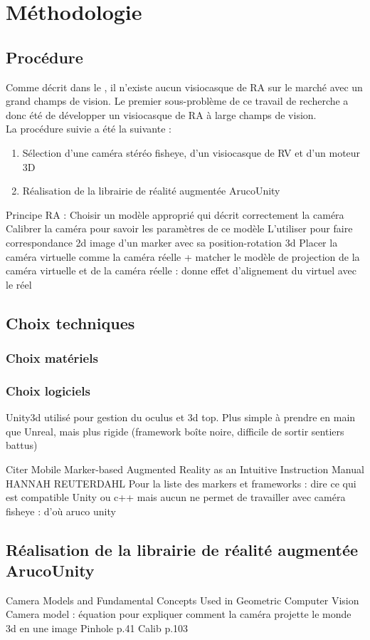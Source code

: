 \chapter{Méthodologie}
\label{ch:methodology}

\section{Procédure}
Comme décrit dans le , il n'existe aucun visiocasque de RA sur le marché avec un grand champs de vision. Le premier sous-problème de ce travail de recherche a donc été de développer un visiocasque de RA à large champs de vision.\\
La procédure suivie a été la suivante :
\begin{enumerate}
  \item Sélection d'une caméra stéréo fisheye, d'un visiocasque de RV et d'un moteur 3D
  \item Réalisation de la librairie de réalité augmentée ArucoUnity
\end{enumerate}
Principe RA :
Choisir un modèle approprié qui décrit correctement la caméra
Calibrer la caméra pour savoir les paramètres de ce modèle
L'utiliser pour faire correspondance 2d image d'un marker avec sa position-rotation 3d
Placer la caméra virtuelle comme la caméra réelle + matcher le modèle de projection de la caméra virtuelle et de la caméra réelle : donne effet d'alignement du virtuel avec le réel

\section{Choix techniques}
\label{sec:technical_choices}
\subsection{Choix matériels}

\subsection{Choix logiciels}

Unity3d utilisé pour gestion du oculus et 3d top. Plus simple à prendre en main que Unreal, mais plus rigide (framework boîte noire, difficile de sortir sentiers battus)

Citer Mobile Marker-based Augmented Reality as
an Intuitive Instruction Manual HANNAH REUTERDAHL
Pour la liste des markers et frameworks : dire ce qui est compatible Unity ou c++ mais aucun ne permet de travailler avec caméra fisheye : d'où aruco unity


\section{Réalisation de la librairie de réalité augmentée ArucoUnity}
Camera Models and Fundamental Concepts Used in Geometric Computer Vision
Camera model : équation pour expliquer comment la caméra projette le monde 3d en une image
Pinhole p.41
Calib p.103